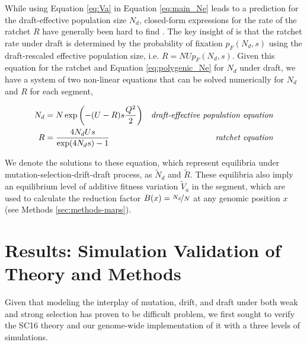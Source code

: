 \documentclass[11pt]{article}
\begin{document}

While using Equation \eqref{eq:Va} in Equation \eqref{eq:main_Ne} leads to a
prediction for the draft-effective population size $N_d$, closed-form
expressions for the rate of the ratchet $R$ have generally been hard to find
\parencite{Haigh1978-gt,Higgs1995-xc,Gessler1995-hz}. The key insight of
\textcite{Santiago2016-mu} is that the ratchet rate under draft is determined
by the probability of fixation $p_F(N_d, s)$
\parencite{Kimura1962-su,Malecot1952-qh} using the draft-rescaled effective
population size, i.e. $R = N U p_F(N_d, s)$. Given this equation for the
ratchet and Equation \eqref{eq:polygenic_Ne} for $N_d$ under draft, we have a
system of two non-linear equations that can be solved numerically for $N_d$ and
$R$ for each segment,

\begin{align}
  \label{eq:main_eqns}
  N_d &= N \exp \left( -(U-R)s \frac{Q^2}{2} \right) & \text{\emph{draft-effective population equation}} \\
  R &= \frac{4N_d U s}{\exp(4 N_d s)-1}  & \text{\emph{ratchet equation}}
\end{align}
%

We denote the solutions to these equation, which represent equilibria under
mutation-selection-drift-draft process, as $\widetilde{N}_d$ and
$\widetilde{R}$. These equilibria also imply an equilibrium level of additive
fitness variation $\widetilde{V}_a$ in the segment, which are used to calculate
the reduction factor $B(x) = \nicefrac{N_d}{N}$ at any genomic position $x$
(see Methods \ref{sec:methods-maps}).

\section*{Results: Simulation Validation of Theory and Methods}

Given that modeling the interplay of mutation, drift, and draft under both weak
and strong selection has proven to be difficult problem, we first sought to
verify the SC16 theory and our genome-wide implementation of it with a three
levels of simulations. 
\end{document}
